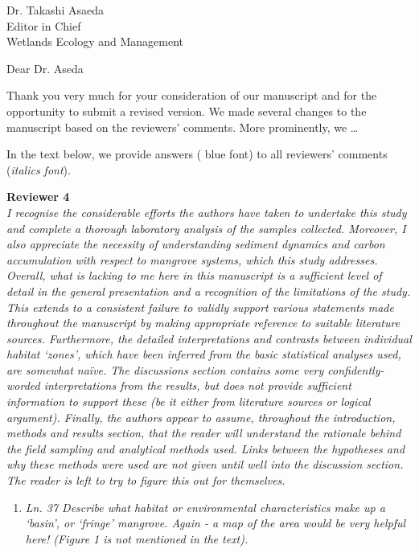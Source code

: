 \documentclass[11pt]{bgcletter}
\begin{document}
\begin{letter}{Dr. Takashi Asaeda\\
 Editor in Chief \\ Wetlands Ecology and Management}

\opening{Dear Dr. Aseda}
Thank you very much for your consideration of our manuscript and for the opportunity to submit a revised version. We made several changes to the manuscript based on the reviewers' comments. More prominently, we \dots 

 In the text below, we provide answers ({\color{blue} blue font}) to all reviewers' comments ({\it italics font}). 

{\bf Reviewer 4} \\

{\it I recognise the considerable efforts the authors have taken to undertake this study and complete a thorough laboratory analysis of the samples collected. Moreover, I also appreciate the necessity of understanding sediment dynamics and carbon accumulation with respect to mangrove systems, which this study addresses. Overall, what is lacking to me here in this manuscript is a sufficient level of detail in the general presentation and a recognition of the limitations of the study. This extends to a consistent failure to validly support various statements made throughout the manuscript by making appropriate reference to suitable literature sources. Furthermore, the detailed interpretations and contrasts between individual habitat `zones', which have been inferred from the basic statistical analyses used, are somewhat na\"ive.  The discussions section contains some very confidently-worded interpretations from the results, but does not provide sufficient information to support these
(be it either from literature sources or logical argument).  Finally, the authors appear to assume, throughout the introduction, methods and results section, that the reader will understand the rationale behind the field sampling and analytical methods used. Links between the hypotheses and why these methods were used are not given until well into the discussion section. The reader is left to try to figure this out for themselves.}

\begin{enumerate}
\item {\it Ln. 37 Describe what habitat or environmental characteristics make up a `basin', or `fringe' mangrove. Again - a map of the area would be very helpful here! (Figure 1 is not mentioned in the text).}


\end{enumerate}
\end{letter}
\end{document}
